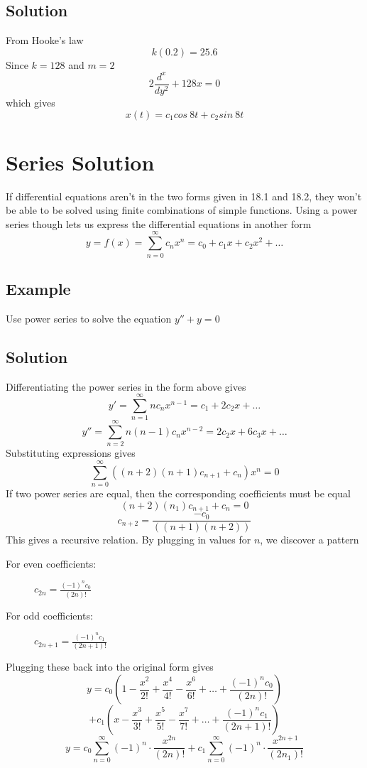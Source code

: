 \subsection*{Solution}
From Hooke's law
$$k(0.2)=25.6$$
Since $k=128$ and $m=2$
$$2\frac{d^x}{dy^2}+128x=0$$
which gives
$$x(t)=c_1cos\:8t+c_2sin\:8t$$

\section{Series Solution}
If differential equations aren't in the two forms given in 18.1 and 18.2, they won't
be able to be solved using finite combinations of simple functions. Using a power
series though lets us express the differential equations in another form
$$y=f(x)=\sum_{n=0}^\infty c_nx^n=c_0+c_1x+c_2x^2+\dots$$

\subsection*{Example}
Use power series to solve the equation $y''+y=0$

\subsection*{Solution}
Differentiating the power series in the form above gives
$$y'=\sum_{n=1}^\infty nc_nx^{n-1}=c_1+2c_2x+\dots$$
$$y''=\sum_{n=2}^\infty n(n-1)c_nx^{n-2}=2c_2x+6c_3x+\dots$$
Substituting expressions gives
$$\sum_{n=0}^\infty \left((n+2)(n+1)c_{n+1}+c_n\right)x^n=0$$
If two power series are equal, then the corresponding coefficients must be equal
$$(n+2)(n_1)c_{n+1}+c_n=0$$
$$c_{n+2}=\frac{-c_0}{\left((n+1)(n+2)\right)}$$
This gives a recursive relation. By plugging in values for $n$, we discover a pattern
\begin{description}
    \item [For even coefficients:] $c_{2n}=\frac{(-1)^nc_0}{(2n)!}$
    \item [For odd coefficients:] $c_{2n+1}=\frac{(-1)^nc_1}{(2n+1)!}$
\end{description}
Plugging these back into the original form gives
$$y=c_0\left(1-\frac{x^2}{2!}+\frac{x^4}{4!}-\frac{x^6}{6!}+\dots + \frac{(-1)^nc_0}{(2n)!}\right)$$
$$+c_1\left(x-\frac{x^3}{3!}+\frac{x^5}{5!}-\frac{x^7}{7!}+\dots + \frac{(-1)^nc_1}{(2n+1)!}\right)$$
$$y=c_0\sum_{n=0}^\infty (-1)^n \cdot \frac{x^{2n}}{(2n)!}+
    c_1\sum_{n=0}^\infty (-1)^n \cdot \frac{x^{2n+1}}{(2n_1)!}$$